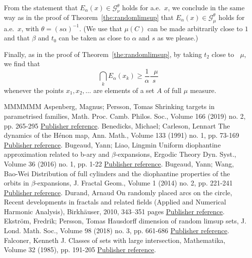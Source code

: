 \documentclass[11pt]{article}
\theoremstyle{definition}
\numberwithin{equation}{section}
\numberwithin{figure}{section}
\numberwithin{table}{section}
\DeclareMathOperator{\dimh}{dim_H}
\DeclareMathOperator{\udimh}{\overline{dim}_H}
\begin{document}
From the statement that $E_\alpha (x) \in \mathscr{G}_\nu^\theta$ holds for a.e.\ $x$, we conclude in the same way as in the proof of Theorem~\ref{the:randomlimsup} that $E_\alpha (x) \in
\mathscr{G}_\mu^\theta$ holds for a.e.\ $x$, with $\theta = (s
\alpha)^{-1}$. (We use that $\mu(C)$ can be made arbitrarily close to
$1$ and that $\beta$ and $t_0$ can be taken as  close to $\alpha$ and $s$ as we please.)

Finally, as in the proof of Theorem~\ref{the:randomlimsup}, by taking $t_2$ close to $\udimh \mu$, we find that
\[
\dimh \bigcap_k E_\alpha (x_k) \geq \frac{1}{\alpha} \frac{\udimh
\mu}{s}
\]
whenever the points $x_1, x_2, \ldots$ are elements of a set $A$ of full $\mu$ measure.

\begin{thebibliography}{MMMMMM}
 Aspenberg, Magnus; Persson, Tomas Shrinking targets in parametrised families, Math. Proc. Camb. Philos. Soc., Volume 166 (2019) no. 2, pp. 265-295 \href{https://ahl.centre-mersenne.org/item/AHL_2019__2__1_0/#aspenbergpersson}{Publisher reference}.
 Benedicks, Michael; Carleson, Lennart The dynamics of the Hénon map, Ann. Math., Volume 133 (1991) no. 1, pp. 73-169 \href{https://ahl.centre-mersenne.org/item/AHL_2019__2__1_0/#benedickscarleson}{Publisher reference}.
 Bugeaud, Yann; Liao, Lingmin Uniform diophantine approximation related to b-ary and \(\beta\)-expansions, Ergodic Theory Dyn. Syst., Volume 36 (2016) no. 1, pp. 1-22 \href{https://ahl.centre-mersenne.org/item/AHL_2019__2__1_0/#bugeaudliao}{Publisher reference}.
 Bugeaud, Yann; Wang, Bao-Wei Distribution of full cylinders and the diophantine properties of the orbits in \(\beta\)-expansions, J. Fractal Geom., Volume 1 (2014) no. 2, pp. 221-241 \href{https://ahl.centre-mersenne.org/item/AHL_2019__2__1_0/#bugeaudwang}{Publisher reference}.
 Durand, Arnaud On randomly placed arcs on the circle, Recent developments in fractals and related fields (Applied and Numerical Harmonic Analysis), Birkhäuser, 2010, 343–351 pages \href{https://ahl.centre-mersenne.org/item/AHL_2019__2__1_0/#durand}{Publisher reference}.
 Ekström, Fredrik; Persson, Tomas Hausdorff dimension of random limsup sets, J. Lond. Math. Soc., Volume 98 (2018) no. 3, pp. 661-686 \href{https://ahl.centre-mersenne.org/item/AHL_2019__2__1_0/#ekstrompersson}{Publisher reference}.
 Falconer, Kenneth J. Classes of sets with large intersection, Mathematika, Volume 32 (1985), pp. 191-205 \href{https://ahl.centre-mersenne.org/item/AHL_2019__2__1_0/#falconer1}{Publisher reference}.

\end{thebibliography}
\end{document}
